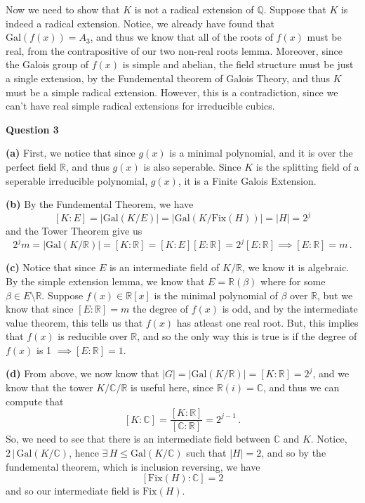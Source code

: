 \documentclass[10pt]{article}
\newcommand{\R}{\mathbb{R}}
\newcommand{\Q}{\mathbb{Q}}
\newcommand{\C}{\mathbb{C}}
\newcommand{\Gal}{\text{Gal}}
\begin{document}
Now we need to show that $K$ is not a radical extension of $\Q$. Suppose that $K$ is indeed a radical extension. Notice, we already have found that $\Gal(f(x)) = A_{3}$, and thus we know that all of the roots of $f(x)$ must be real, from the contrapositive of our two non-real roots lemma. Moreover, since the Galois group of $f(x)$ is simple and abelian, the field structure must be just a single extension, by the Fundemental theorem of Galois Theory, and thus $K$ must be a simple radical extension. However, this is a contradiction, since we can't have real simple radical extensions for irreducible cubics.

\newpage
\textbf{Question 3}

\textbf{(a)} First, we notice that since $g(x)$ is a minimal polynomial, and it is over the perfect field $\R$, and thus $g(x)$ is also seperable. Since $K$ is the splitting field of a seperable irreducible polynomial, $g(x)$, it is a Finite Galois Extension.

\textbf{(b)} By the Fundemental Theorem, we have
\[ [K:E] = |\Gal(K/E)| = |\Gal(K/\text{Fix}(H))| = |H| = 2^{j} \]
and the Tower Theorem give us
\[ 2^{j}m = |\Gal(K/\R)| = [K:\R] = [K:E][E:\R] = 2^{j}[E:\R] \implies [E:\R] = m \, .\]

\textbf{(c)} Notice that since $E$ is an intermediate field of $K/\R$, we know it is algebraic. By the simple extension lemma, we know that $E = \R(\beta)$ where for some $\beta \in E\setminus \R$. Suppose $f(x) \in \R[x]$ is the minimal polynomial of $\beta$ over $\R$, but we know that since $[E:\R] = m$ the degree of $f(x)$ is odd, and by the intermediate value theorem, this tells us that $f(x)$ has atleast one real root. But, this implies that $f(x)$ is reducible over $\R$, and so the only way this is true is if the degree of $f(x)$ is 1 $\implies [E:\R] = 1$.

\textbf{(d)} From above, we now know that $|G| = |\Gal(K/\R)| = [K:\R] = 2^{j}$, and we know that the tower $K/\C/\R$ is useful here, since $\R(i) = \C$, and thus we can compute that
\[ [K:\C] = \frac{[K:\R]}{[\C:\R]} = 2^{j-1} \, .\]
So, we need to see that there is an intermediate field between $\C$ and $K$. Notice, $2\, |\, \Gal(K/\C)$, hence $\exists \, H \leq \Gal(K/\C)$ such that $|H| = 2$, and so by the fundemental theorem, which is inclusion reversing, we have
\[ [\text{Fix}(H): \C] = 2 \]
and so our intermediate field is $\text{Fix}(H)$.
\end{document}
